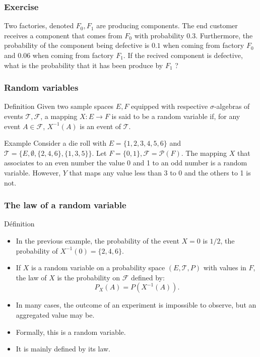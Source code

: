 \documentclass[main.tex]{subfiles}
\begin{document}
\begin{frame}
    \frametitle{Exercise}
Two factories, denoted $F_0, F_1$ are producing components.  The end customer 
receives a component that comes from $F_0$ with probability $0.3$. Furthermore,
the probability of the component being defective is $0.1$ when coming from factory $F_0$
and $0.06$ when coming from factory $F_1$. If the recived component is defective,
what is the probability that it has been produce by $F_1$ ?

\end{frame}
\begin{frame}
    \frametitle{Random variables}
\begin{block}{Definition}
    Given two sample spaces $E,F$ equipped with respective $\sigma$-algebras of events 
    $\mathcal{T},\mathcal{F}$, a mapping $X \colon E \to F$ is said to be 
    a random variable if, for any event $A \in \mathcal{F}$, $X^{-1}\left( A \right)$
    is an event of $\mathcal{T}.$
\end{block}
\begin{block}{Example}
    Consider a die roll with $E=\{1,2,3,4,5,6\}$ and 
    $\mathcal{T}=\{E,\emptyset,\{2,4,6\},\{1,3,5\}\}$. Let $F=\{0,1\}, \mathcal{F}=\mathcal{P}(F).$
    The mapping $X$ that associates to an even number the value 0 and 1 to an odd number
    is a random variable. However, $Y$ that maps any value less than 3 to 0 and the
    others to 1 is not.
\end{block}
\end{frame}
\begin{frame}
    \frametitle{The law of a random variable}
\begin{block}{Définition}
    \begin{itemize}
        \item<+-> In the previous example,  
        the probability of the event $X=0$ is $1/2$, the probability of  
        $X^{-1}\left( 0 \right)=\{2,4,6\}.$
        \item<+-> If $X$ is a random variable on a probability space $\left( E,\mathcal{T},P \right)$
        with values in $F$, the law of $X$ is the probability on $\mathcal{F}$ defined by:
        \begin{equation}
            P_X \left( A \right) = P \left( X^{-1}(A) \right).
        \end{equation}
    \item<+-> In many cases, the outcome of an experiment is impossible to observe, but 
    an aggregated value may be.
    \item<+-> Formally, this is a random variable.
    \item<+-> It is mainly defined by its law.
   \end{itemize} 
\end{block}    
\end{frame}
\end{document}
